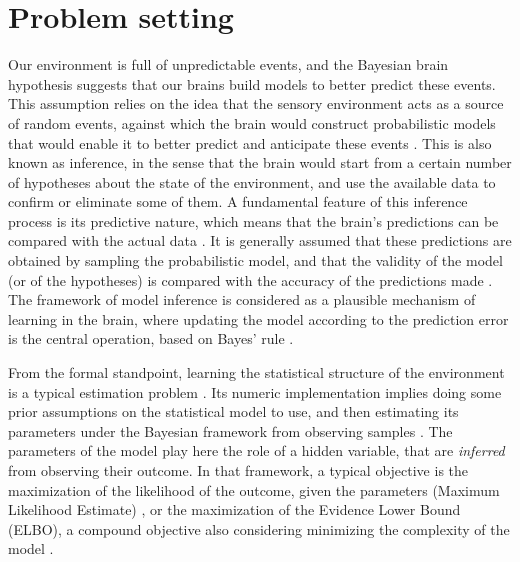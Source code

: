 \documentclass[10pt,letterpaper]{article}
\begin{document}
\section{Problem setting}

Our environment is full of unpredictable events, and the Bayesian brain hypothesis \cite{knill2004bayesian} suggests that our brains build models to better predict these events. This assumption relies on the idea that the sensory environment acts as a source of random events, against which the brain would construct probabilistic models that would enable it to better predict and anticipate these events \cite{friston2005theory}. This is also known as inference, in the sense that the brain would start from a certain number of hypotheses about the state of the environment, and use the available data to confirm or eliminate some of them. A fundamental feature of this inference process is its predictive nature, which means that the brain's predictions can be compared with the actual data \cite{rao1999predictive}. It is generally assumed that these predictions are obtained by sampling the probabilistic model, and that the validity of the model (or of the hypotheses) is compared with the accuracy of the predictions made \cite{griffiths2008bayesian}. The framework of model inference is considered as a plausible mechanism of learning in the brain, where updating the model according to the prediction error is the central operation, based on Bayes' rule \cite{doya2007bayesian,fiser2010statistically}.


From the formal standpoint, learning the statistical structure of the environment is a typical estimation problem \cite{bishop2006pattern}. Its numeric implementation implies doing some prior assumptions on the statistical model to use, and then estimating its parameters under the Bayesian framework from observing samples \cite{gelman1995bayesian}. The parameters of the model play here the role of a hidden variable, that are \emph{inferred} from observing their outcome. In that framework, a typical objective is the maximization of the likelihood of the outcome, given the parameters (Maximum Likelihood Estimate) \cite{myung2003tutorial}, or the maximization of the Evidence Lower Bound (ELBO), a compound objective also considering minimizing the complexity of the model \cite{kingma2013auto,blei2017variational}.
\end{document}
